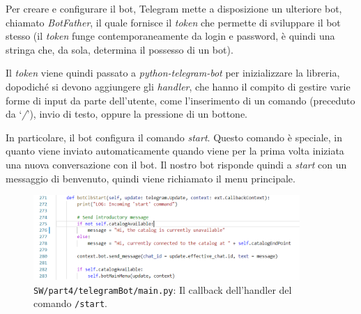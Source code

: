 \documentclass[12pt,a4paper]{article}
\begin{document}
Per creare e configurare il bot, Telegram mette a disposizione un ulteriore bot, chiamato \textit{BotFather}, il quale fornisce il \textit{token} che permette di sviluppare il bot stesso (il \textit{token} funge contemporaneamente da login e password, è quindi una stringa che, da sola, determina il possesso di un bot).

Il \textit{token} viene quindi passato a \textit{python-telegram-bot} per inizializzare la libreria, dopodiché si devono aggiungere gli \textit{handler}, che hanno il compito di gestire varie forme di input da parte dell'utente, come l'inserimento di un comando (preceduto da `\textit{/}'), invio di testo, oppure la pressione di un bottone.

In particolare, il bot configura il comando \textit{start}. Questo comando è speciale, in quanto viene inviato automaticamente quando viene per la prima volta iniziata una nuova conversazione con il bot. Il nostro bot risponde quindi a \textit{start} con un messaggio di benvenuto, quindi viene richiamato il menu principale.

\begin{figure}[htbp]
    \centering
    \includegraphics[width=0.9\textwidth]{bot_clb_start.png}
    \caption*{\texttt{SW/part4/telegramBot/main.py}: Il callback dell'handler del comando \texttt{/start}.}
    \label{fig:bot_clb_start}
\end{figure}
\end{document}

